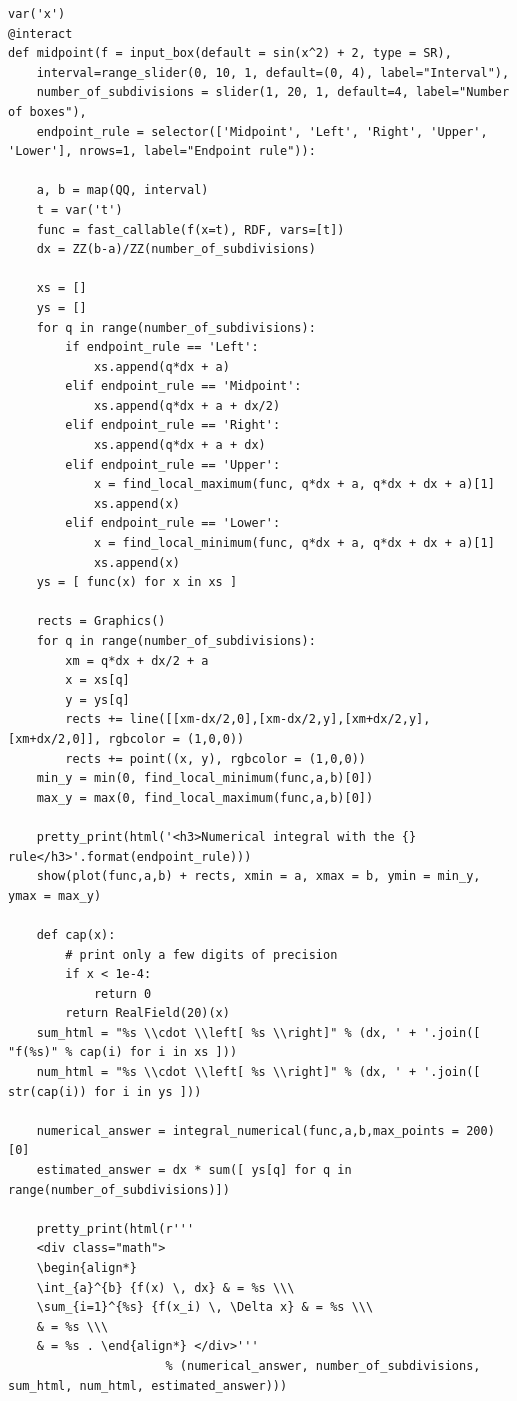 \documentclass[11pt, oneside]{article}   	%
\begin{document}
\begin{verbatim}
var('x')
@interact
def midpoint(f = input_box(default = sin(x^2) + 2, type = SR),
    interval=range_slider(0, 10, 1, default=(0, 4), label="Interval"),
    number_of_subdivisions = slider(1, 20, 1, default=4, label="Number of boxes"),
    endpoint_rule = selector(['Midpoint', 'Left', 'Right', 'Upper', 'Lower'], nrows=1, label="Endpoint rule")):

    a, b = map(QQ, interval)
    t = var('t')
    func = fast_callable(f(x=t), RDF, vars=[t])
    dx = ZZ(b-a)/ZZ(number_of_subdivisions)
   
    xs = []
    ys = []
    for q in range(number_of_subdivisions):
        if endpoint_rule == 'Left':
            xs.append(q*dx + a)
        elif endpoint_rule == 'Midpoint':
            xs.append(q*dx + a + dx/2)
        elif endpoint_rule == 'Right':
            xs.append(q*dx + a + dx)
        elif endpoint_rule == 'Upper':
            x = find_local_maximum(func, q*dx + a, q*dx + dx + a)[1]
            xs.append(x)
        elif endpoint_rule == 'Lower':
            x = find_local_minimum(func, q*dx + a, q*dx + dx + a)[1]
            xs.append(x)
    ys = [ func(x) for x in xs ]
         
    rects = Graphics()
    for q in range(number_of_subdivisions):
        xm = q*dx + dx/2 + a
        x = xs[q]
        y = ys[q]
        rects += line([[xm-dx/2,0],[xm-dx/2,y],[xm+dx/2,y],[xm+dx/2,0]], rgbcolor = (1,0,0))
        rects += point((x, y), rgbcolor = (1,0,0))
    min_y = min(0, find_local_minimum(func,a,b)[0])
    max_y = max(0, find_local_maximum(func,a,b)[0])

    pretty_print(html('<h3>Numerical integral with the {} rule</h3>'.format(endpoint_rule)))
    show(plot(func,a,b) + rects, xmin = a, xmax = b, ymin = min_y, ymax = max_y)
    
    def cap(x):
        # print only a few digits of precision
        if x < 1e-4:
            return 0
        return RealField(20)(x)
    sum_html = "%s \\cdot \\left[ %s \\right]" % (dx, ' + '.join([ "f(%s)" % cap(i) for i in xs ]))
    num_html = "%s \\cdot \\left[ %s \\right]" % (dx, ' + '.join([ str(cap(i)) for i in ys ]))
    
    numerical_answer = integral_numerical(func,a,b,max_points = 200)[0]
    estimated_answer = dx * sum([ ys[q] for q in range(number_of_subdivisions)])

    pretty_print(html(r'''
    <div class="math"> 
    \begin{align*} 
    \int_{a}^{b} {f(x) \, dx} & = %s \\\ 
    \sum_{i=1}^{%s} {f(x_i) \, \Delta x} & = %s \\\ 
    & = %s \\\ 
    & = %s . \end{align*} </div>''' 
                      % (numerical_answer, number_of_subdivisions, sum_html, num_html, estimated_answer)))

\end{verbatim} 
\end{document}

